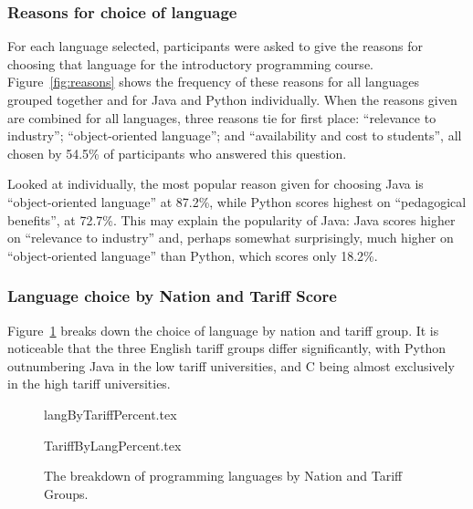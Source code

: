 \documentclass{sig-alternate}
\begin{document}

\subsubsection{Reasons for choice of language}
For each language selected, participants were asked to give the reasons for choosing that language for the introductory programming course. Figure~\ref{fig:reasons} shows the frequency of these reasons for all languages grouped together and for Java and Python individually. When the reasons given are combined for all languages, three reasons tie for first place: ``relevance to industry''; ``object-oriented language''; and ``availability and cost to students'', all chosen by 54.5\% of participants who answered this question.

Looked at individually, the most popular reason given for choosing Java is ``object-oriented language'' at 87.2\%, while Python scores highest on ``pedagogical benefits'', at 72.7\%. This may explain the popularity of Java: Java scores higher on ``relevance to industry'' and, perhaps somewhat surprisingly, much higher on ``object-oriented language'' than Python, which scores only 18.2\%.

\subsubsection{Language choice by Nation and Tariff Score}

Figure~\ref{fig;LangTariff} breaks down the choice of language by
nation and tariff group.  It is noticeable that the three English
tariff groups differ significantly, with Python outnumbering Java in
the low tariff universities, and C being almost exclusively in the
high tariff universities.

\begin{figure}[ht]
\begin{center}
{langByTariffPercent.tex}
\end{center}%
%
\begin{center}
{TariffByLangPercent.tex}
\end{center}\vskip-18pt
\caption{The breakdown of programming languages by Nation and Tariff Groups.\label{fig;LangTariff}}
\end{figure}
\end{document}
